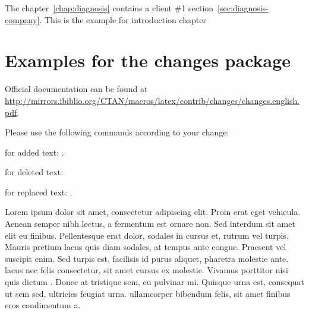 The chapter~\ref{chap:diagnosis} contains a client \#1 section~\ref{sec:diagnosis-company}.
This is the example for introduction chapter


\section{Examples for the changes package}

Official documentation can be found at \url{http://mirrors.ibiblio.org/CTAN/macros/latex/contrib/changes/changes.english.pdf}.

Please use the following commands according to your change:

for added text:
.

for deleted text:

for replaced text:
.

Lorem ipsum dolor sit amet, consectetur adipiscing elit. 
Proin  erat eget vehicula. Aenean semper nibh lectus, a fermentum est ornare non. Sed interdum sit amet elit eu finibus. 
Pellentesque erat dolor, sodales in cursus et, rutrum vel turpis. 
Mauris pretium lacus quis diam sodales, at tempus ante congue. 
Praesent vel suscipit enim. Sed turpis est, facilisis id purus aliquet, pharetra molestie ante. 
 lacus nec felis consectetur, sit amet cursus ex molestie. Vivamus porttitor nisi quis dictum . 
Donec at tristique sem, eu pulvinar mi. 
Quisque urna est, consequat ut sem sed, ultricies feugiat urna. 
 ullamcorper bibendum felis, sit amet finibus eros condimentum a.


